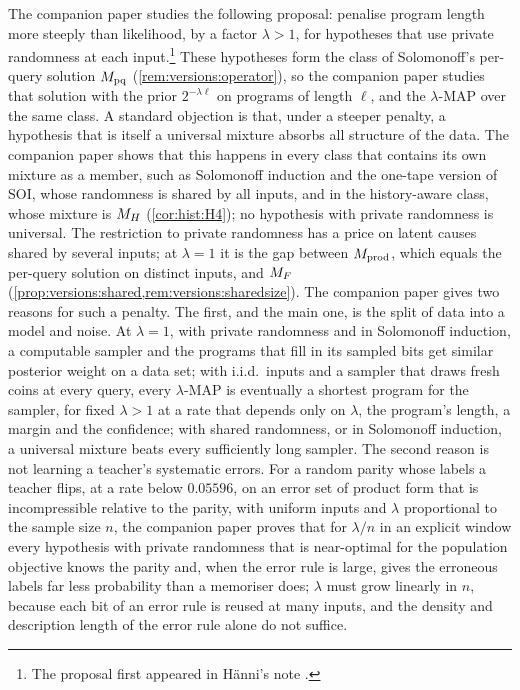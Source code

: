 The companion paper \citep{claudeSFI2026steeper} studies the following proposal: penalise program length more steeply than likelihood, by a factor $\lambda>1$, for hypotheses that use private randomness at each input.\footnote{The proposal first appeared in H\"anni's note \citep{hanni2026grokking}.} These hypotheses form the class of Solomonoff's per-query solution $M_{\mathrm{pq}}$ (\cref{rem:versions:operator}), so the companion paper studies that solution with the prior $2^{-\lambda\ell}$ on programs of length $\ell$, and the $\lambda$-MAP over the same class. A standard objection is that, under a steeper penalty, a hypothesis that is itself a universal mixture absorbs all structure of the data. The companion paper shows that this happens in every class that contains its own mixture as a member, such as Solomonoff induction and the one-tape version of SOI, whose randomness is shared by all inputs, and in the history-aware class, whose mixture is $M_{H}$ (\cref{cor:hist:H4}); no hypothesis with private randomness is universal. The restriction to private randomness has a price on latent causes shared by several inputs; at $\lambda=1$ it is the gap between $M_{\mathrm{prod}}$, which equals the per-query solution on distinct inputs, and $M_{F}$ (\cref{prop:versions:shared,rem:versions:sharedsize}). The companion paper gives two reasons for such a penalty. The first, and the main one, is the split of data into a model and noise. At $\lambda=1$, with private randomness and in Solomonoff induction, a computable sampler and the programs that fill in its sampled bits get similar posterior weight on a data set; with i.i.d.\ inputs and a sampler that draws fresh coins at every query, every $\lambda$-MAP is eventually a shortest program for the sampler, for fixed $\lambda>1$ at a rate that depends only on $\lambda$, the program's length, a margin and the confidence; with shared randomness, or in Solomonoff induction, a universal mixture beats every sufficiently long sampler. The second reason is not learning a teacher's systematic errors. For a random parity whose labels a teacher flips, at a rate below $0.05596$, on an error set of product form that is incompressible relative to the parity, with uniform inputs and $\lambda$ proportional to the sample size $n$, the companion paper proves that for $\lambda/n$ in an explicit window every hypothesis with private randomness that is near-optimal for the population objective knows the parity and, when the error rule is large, gives the erroneous labels far less probability than a memoriser does; $\lambda$ must grow linearly in $n$, because each bit of an error rule is reused at many inputs, and the density and description length of the error rule alone do not suffice.
